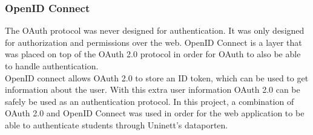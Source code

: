 \subsubsection{OpenID Connect}
The OAuth protocol was never designed for authentication. It was only designed for authorization and permissions over the web. OpenID Connect\cite{openidconnect} is a layer that was placed on top of the OAuth 2.0 protocol in order for OAuth to also be able to handle authentication.
\\[11pt]
OpenID connect allows OAuth 2.0 to store an ID token, which can be used to get information about the user. With this extra user information OAuth 2.0 can be safely be used as an authentication protocol. In this project, a combination of OAuth 2.0 and OpenID Connect was used in order for the web application to be able to authenticate students through Uninett's dataporten\cite{dataporten}.